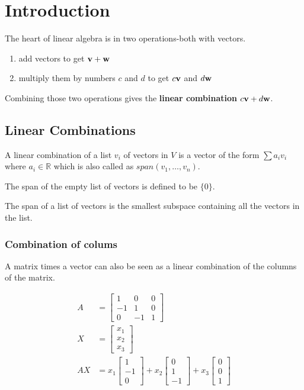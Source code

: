 \chapter{Introduction}

The heart of linear algebra is in two operations-both with vectors.
\begin{enumerate}
	\item add vectors to get $\textbf v + \textbf w$
	\item multiply them by numbers $c$ and $d$ to get $c \textbf v$ and $d \textbf w$
\end{enumerate}
Combining those two operations gives the \textbf{linear combination} $c\textbf v + d \textbf w$.

\section{Linear Combinations}

A linear combination of a list $v_i$ of vectors in $V$ is a vector of the form $\sum a_i v_i$ where $a_i \in \mathbb{R}$ which is also called as $span(v_1,\ldots,v_n)$.

The span of the empty list of vectors is defined to be $\{0\}$.

The span of a list of vectors is the smallest subspace containing all the vectors in the list.

\subsection{Combination of colums}
A matrix times a vector can also be seen as a linear combination of the columns of the matrix.

\begin{align*}
	A  & = \begin{bmatrix} 1 & 0 & 0 \\ -1 & 1 & 0 \\ 0 & -1 & 1 \end{bmatrix}     \\
	X  & = \begin{bmatrix} x_1 \\ x_2 \\ x_3 \end{bmatrix}     \\
	AX & = x_1 \begin{bmatrix} 1 \\ -1 \\ 0 \end{bmatrix}
	+ x_2 \begin{bmatrix} 0 \\ 1 \\ -1 \end{bmatrix}
	+ x_3 \begin{bmatrix} 0 \\ 0 \\ 1 \end{bmatrix}
\end{align*}

